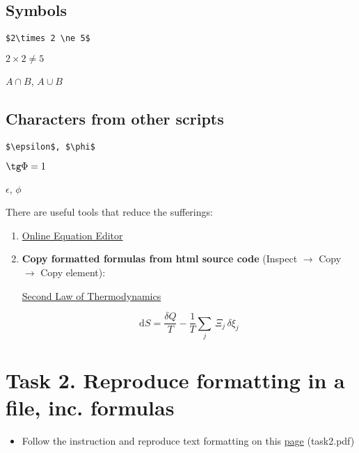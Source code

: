 \documentclass[a4paper,11pt,leqno]{article}
\begin{document}
\subsection{Symbols}
\verb|$2\times 2 \ne 5$|

$2\times 2 \ne 5$

$A \cap B$, $A \cup B$

\subsection{Characters from other scripts}
\verb|$\epsilon$, $\phi$|

$\tg \Phi = 1$

$\epsilon$, $\phi$

\bigskip

There are useful tools that reduce the sufferings:

\begin{enumerate}
	\item \href{https://latexeditor.lagrida.com/}{Online Equation Editor} 
	\item \textbf{{\color{red}Copy formatted formulas from html source code}} (Inspect $\rightarrow$ Copy $\rightarrow$ Copy element):
	
	\href{https://en.wikipedia.org/wiki/Second_law_of_thermodynamics}{Second Law of Thermodynamics}
	
	\[\mathrm {d} S={\frac {\delta Q}{T}}-{\frac {1}{T}}\sum _{j}\,\Xi _{j}\,\delta \xi _{j}\]
\end{enumerate}

\section*{Task 2. Reproduce formatting in a file, inc. formulas}
\label{task}

\begin{tcolorbox}[width=\textwidth, colback={yellow!40!white}, title={}, colbacktitle=yellow!60!white, coltitle=black]
	\begin{itemize}
		\item Follow the instruction and reproduce text formatting on this \href{https://github.com/kunilovskaya/dskills_workshop/blob/main/w1_latex_basics/task2.pdf}{page} (task2.pdf)
	\end{itemize}
	
\end{tcolorbox}%
\end{document}
